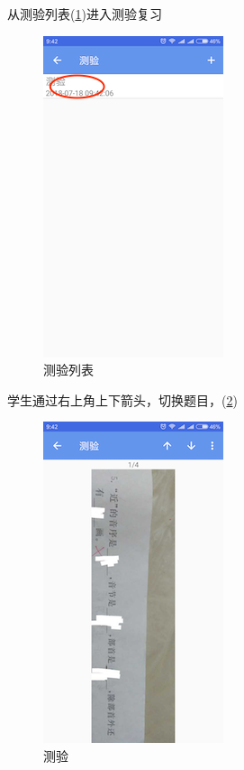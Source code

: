 从测验列表(\ref{img34})进入测验复习
\begin{figure}[H]
	\centering
	\includegraphics{img/34.png}
	\caption{测验列表}
	\label{img34}
\end{figure}

学生通过右上角上下箭头，切换题目，(\ref{img35})
\begin{figure}[H]
	\centering
	\includegraphics{img/35.png}
	\caption{测验}
	\label{img35}
\end{figure}

